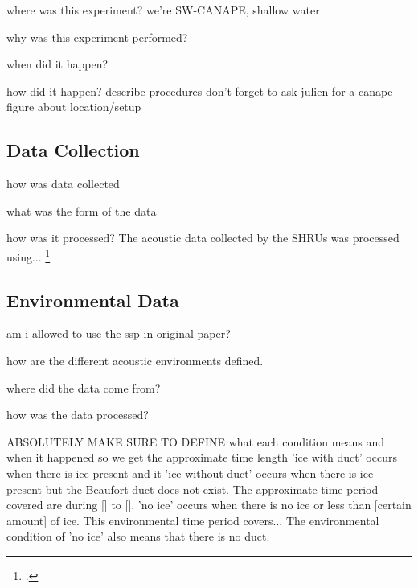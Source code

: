 where was this experiment?
we're SW-CANAPE, shallow water

why was this experiment performed?

when did it happen?

how did it happen? describe procedures
don't forget to ask julien for a canape figure about location/setup


\subsection{Data Collection}

how was data collected

what was the form of the data

how was it processed?
The acoustic data collected by the SHRUs was processed using...
\footcite[]{Bonnel2021}

\subsection{Environmental Data} \label{env_info}
am i allowed to use the ssp in original paper?


how are the different acoustic environments defined.

where did the data come from?

how was the data processed?

ABSOLUTELY MAKE SURE TO DEFINE what each condition means and when it happened so we get the approximate time length
'ice with duct' occurs when there is ice present and it 
'ice without duct' occurs when there is ice present but the Beaufort duct does not exist. The approximate time period covered  are during [] to [].                                                                                            
'no ice' occurs when there is no ice or less than [certain amount] of ice. This environmental time period covers...
The environmental condition of 'no ice' also means that there is no duct.

